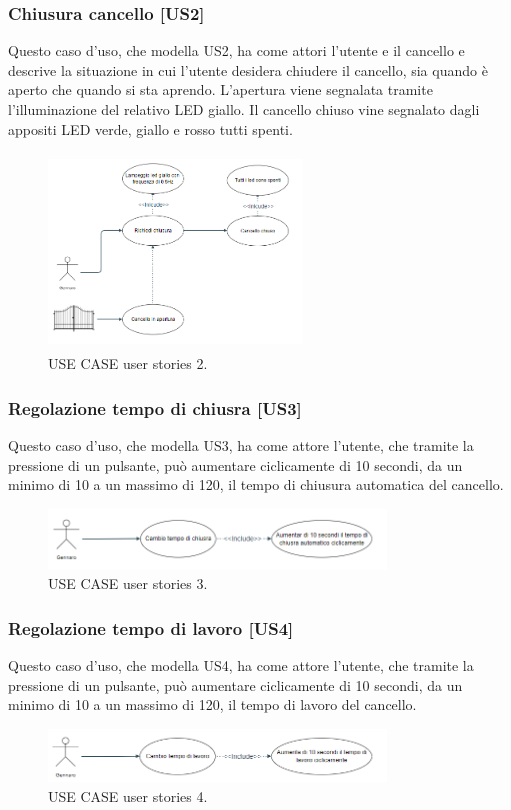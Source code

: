 \documentclass[12pt]{article}
\begin{document}
\subsubsection{Chiusura cancello [US2]}
Questo caso d'uso, che modella US2, ha come attori l'utente e il cancello e descrive la situazione in cui l'utente desidera chiudere il cancello, sia quando è aperto che quando si sta aprendo. L'apertura viene segnalata tramite l'illuminazione del relativo LED giallo. Il cancello chiuso vine segnalato dagli appositi LED verde, giallo e rosso tutti spenti.
    \begin{figure}[h]
        \centering
        \includegraphics[width=0.6\textwidth,height=5.2cm]{use_case_us2.PNG}
        \caption{USE CASE user stories 2.}
        \label{fig:use_case_us2}
    \end{figure}
\subsubsection{Regolazione tempo di chiusra [US3]}
Questo caso d'uso, che modella US3, ha come attore l'utente, che tramite la pressione di un pulsante, può aumentare ciclicamente di 10 secondi, da un minimo di 10 a un massimo di 120, il tempo di chiusura automatica del cancello.
    \begin{figure}[h]
        \centering
        \includegraphics[width=0.8\textwidth]{use_case_us3.PNG}
        \caption{USE CASE user stories 3.}
        \label{fig:use_case_us3}
    \end{figure}
\subsubsection{Regolazione tempo di lavoro [US4]}
Questo caso d'uso, che modella US4, ha come attore l'utente, che tramite la pressione di un pulsante, può aumentare ciclicamente di 10 secondi, da un minimo di 10 a un massimo di 120, il tempo di lavoro del cancello.
    \begin{figure}[h]
        \centering
        \includegraphics[width=0.8\textwidth]{use_case_us4.PNG}
        \caption{USE CASE user stories 4.}
        \label{fig:use_case_us4}
    \end{figure}
\end{document}
